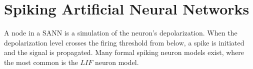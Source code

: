 \section{Spiking Artificial Neural Networks}
	\label{secSpikingANNBackgroundInfo}
	A node in a SANN is a simulation of the neuron's depolarization.
	When the depolarization level crosses the firing threshold from below, a spike is initiated and the signal is propagated.
	Many formal spiking neuron models exist, where the most common is the $LIF$ neuron model\cite{florian03}. %
	

